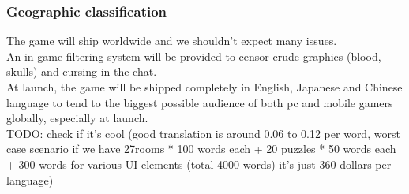 \subsubsection{Geographic classification}
The game will ship worldwide and we shouldn't expect many issues. \\

An in-game filtering system will be provided to censor crude graphics (blood, skulls) and cursing in the chat. \\

At launch, the game will be shipped completely in English, Japanese and Chinese language to tend to the biggest possible audience of both pc and mobile gamers globally, especially at launch. \\

TODO: check if it's cool (good translation is around 0.06 to 0.12 per word, worst case scenario if we have 27rooms * 100 words each + 20 puzzles * 50 words each + 300 words for various UI elements (total 4000 words) it's just 360 dollars per language)

\clearpage